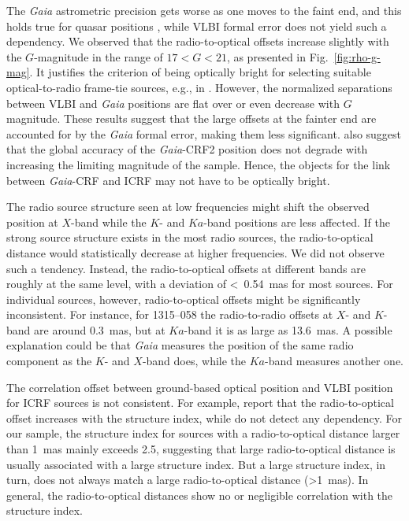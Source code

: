 \documentclass{aa}
\begin{document}
    The \textit{Gaia} astrometric precision gets worse as one moves to the faint end, and this holds true for quasar positions \citep{2016A&A...595A...5M,2018A&A...616A..14G}, while VLBI formal error does not yield such a dependency.
    We observed that the radio-to-optical offsets increase slightly with the $G$-magnitude in the range of $17<G<21$, as presented in Fig.~\ref{fig:rho-g-mag}.
    It justifies the criterion of being optically bright for selecting suitable optical-to-radio frame-tie sources, e.g., in \citet{2008A&A...490..403B,2012MmSAI..83..952M}.
    However, the normalized separations between VLBI and \textit{Gaia} positions are flat over or even decrease with $G$ magnitude.
    These results suggest that the large offsets at the fainter end are accounted for by the \textit{Gaia} formal error, making them less significant.
    \citet{2020A&A...634A..28L} also suggest that the global accuracy of the \textit{Gaia}-CRF2 position does not degrade with increasing the limiting magnitude of the sample.
    Hence, the objects for the link between \textit{Gaia}-CRF and ICRF may not have to be optically bright.

    The radio source structure seen at low frequencies might shift the observed position at $X$-band while the $K$- and $Ka$-band positions are less affected.
    If the strong source structure exists in the most radio sources, the radio-to-optical distance would statistically decrease at higher frequencies.
    We did not observe such a tendency.
    Instead, the radio-to-optical offsets at different bands are roughly at the same level, with a deviation of <~0.54~mas for most sources.
    For individual sources, however, radio-to-optical offsets might be significantly inconsistent.
    For instance, for 1315--058 the radio-to-radio offsets at $X$- and $K$-band are around 0.3~mas, but at $Ka$-band it is as large as 13.6~mas.
    A possible explanation could be that \textit{Gaia} measures the position of the same radio component as the $K$- and $X$-band does, while the $Ka$-band measures another one.

	The correlation offset between ground-based optical position and VLBI position for ICRF sources is not consistent.
	For example, \citet{2011A&A...532A.115C,2014AJ....147...95Z} report that the radio-to-optical offset increases with the structure index,
	while \citet{2013MNRAS.430.2797A} do not detect any dependency.
    For our sample, the structure index for sources with a radio-to-optical distance larger than 1~mas mainly exceeds 2.5, suggesting that large radio-to-optical distance is usually associated with a large structure index.
    But a large structure index, in turn, does not always match a large radio-to-optical distance (>1~mas).
    In general, the radio-to-optical distances show no or negligible correlation with the structure index.
\end{document}

